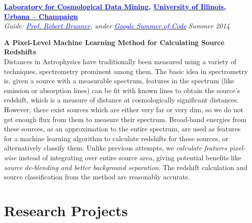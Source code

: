 \documentclass[margin,line]{res}
\newenvironment{list1}{
  \begin{list}{\ding{113}}{%
      \setlength{\itemsep}{0in}
      \setlength{\parsep}{0in} \setlength{\parskip}{0in}
      \setlength{\topsep}{0in} \setlength{\partopsep}{0in} 
      \setlength{\leftmargin}{0.17in}}}{\end{list}}
\begin{document}
\begin{resume}
{\bf \href{http://lcdm.astro.illinois.edu/}{\textcolor{blue} {Laboratory for Cosmological Data Mining}}, \href{http://www.illinois.edu/}{\textcolor{blue}{University of Illinois, Urbana -- Champaign}}} \\
{\em Guide: \href{hhttp://www.astro.illinois.edu/people/bigdog}{\textcolor{blue}{Prof. Robert Brunner}}, under \href{https://www.google-melange.com/gsoc/homepage/google/gsoc2014}{\textcolor{blue} {Google Summer of Code}}} \hfill {\it Summer 2014} \\
\vspace*{-.13in}
\begin{list1}
\item[]\textbf{A Pixel-Level Machine Learning Method for Calculating Source Redshifts} \\
Distances in Astrophysics have traditionally been measured using a variety of techniques, spectrometry prominent among them. The basic idea in spectrometry is, given a source with a measurable spectrum, features in the spectrum (like emission or absorption lines) can be fit with known lines to obtain the source's redshift, which is a measure of distance at cosmologically significant distances. However, there exist sources which are either very far or very dim, so we do not get enough flux from them to measure their spectrum. Broad-band energies from these sources, as an approximation to the entire spectrum, are used as features for a machine learning algorithm to calculate redshifts for these sources, or alternatively classify them. Unlike previous attempts, we \textit{calculate features pixel-wise} instead of integrating over entire source area, giving potential benefits like \textit{source de-blending and better background separation}. The redshift calculation and source classification from the method are reasonably accurate.
\end{list1}

\newpage
\section{\sc Research Projects}


\end{resume}
\end{document}
